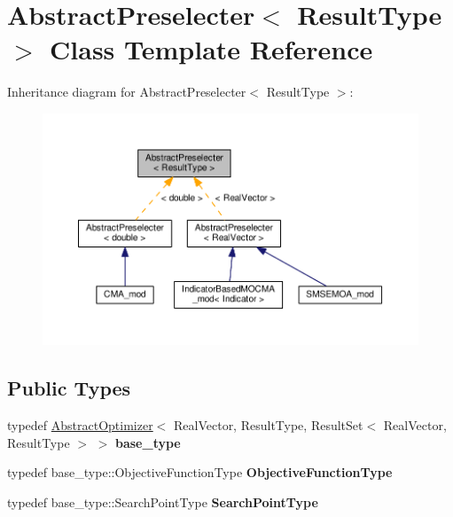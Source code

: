 \hypertarget{classAbstractPreselecter}{}\section{Abstract\+Preselecter$<$ Result\+Type $>$ Class Template Reference}
\label{classAbstractPreselecter}


Inheritance diagram for Abstract\+Preselecter$<$ Result\+Type $>$\+:\nopagebreak
\begin{figure}[H]
\begin{center}
\leavevmode
\includegraphics[width=350pt]{classAbstractPreselecter__inherit__graph}
\end{center}
\end{figure}
\subsection*{Public Types}
\begin{DoxyCompactItemize}
\item 
typedef \hyperlink{classAbstractOptimizer}{Abstract\+Optimizer}$<$ Real\+Vector, Result\+Type, Result\+Set$<$ Real\+Vector, Result\+Type $>$ $>$ {\bfseries base\+\_\+type}\hypertarget{classAbstractPreselecter_a9d56c27fc2428c60a99dea0504717794}{}\label{classAbstractPreselecter_a9d56c27fc2428c60a99dea0504717794}

\item 
typedef base\+\_\+type\+::\+Objective\+Function\+Type {\bfseries Objective\+Function\+Type}\hypertarget{classAbstractPreselecter_ae3b0b31dee2296bb9ab385b80ac6a27e}{}\label{classAbstractPreselecter_ae3b0b31dee2296bb9ab385b80ac6a27e}

\item 
typedef base\+\_\+type\+::\+Search\+Point\+Type {\bfseries Search\+Point\+Type}\hypertarget{classAbstractPreselecter_a0b3b8c0fcb55a3f75337939d1cae182e}{}\label{classAbstractPreselecter_a0b3b8c0fcb55a3f75337939d1cae182e}

\end{DoxyCompactItemize}

